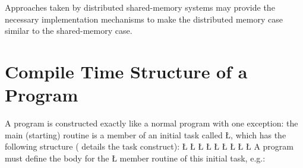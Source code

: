 \documentclass[openright,twoside]{report}
\begin{document}
\begin{annotation}
Approaches taken by distributed shared-memory systems may provide the necessary implementation mechanisms to make the distributed memory case similar to the shared-memory case.
\end{annotation}


\section{\texorpdfstring{Compile Time Structure of a \uC Program}{Compile Time Structure of a uC++ Program}}
\label{s:CompileTimeStructureuCProgram}

A \uC program is constructed exactly like a normal \CC program with one exception:
the main (starting) routine is a member of an initial task called \LGinlinetrue\LGbegin\lgrinde\L{}\endlgrinde\LGend{}, which has the following structure ( details the task construct):
\LGinlinefalse\LGbegin\lgrinde
\L{}
\L{}
\L{\LB{}}
\CE{}\L{\LB{}}
\CE{}\L{\LB{}}
\CE{}\L{\LB{}}
\CE{}\L{}
\L{\LB{}}
\L{\LB{\};}}
\endlgrinde\LGend
{}%
%
%
A \uC program must define the body for the \LGinlinetrue\LGbegin\lgrinde\L{}\endlgrinde\LGend{} member routine of this initial task, e.g.:
\LGinlinefalse\LGbegin\lgrinde
\end{document}
